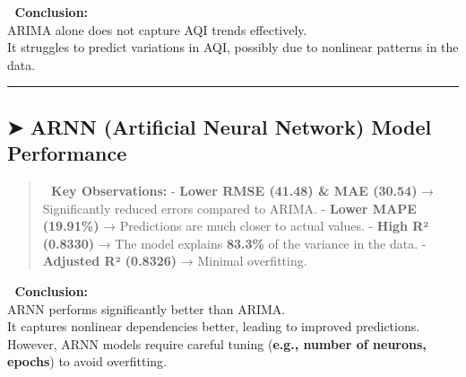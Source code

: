 \documentclass[11pt]{article}
\begin{document}
📌 \textbf{Conclusion:}\\
\hspace*{0.333em}\hspace*{0.333em}\hspace*{0.333em}\hspace*{0.333em}ARIMA
alone does not capture AQI trends effectively.\\
\hspace*{0.333em}\hspace*{0.333em}\hspace*{0.333em}\hspace*{0.333em}It
struggles to predict variations in AQI, possibly due to nonlinear
patterns in the data.

\begin{center}\rule{0.5\linewidth}{0.5pt}\end{center}

\hypertarget{arnn-artificial-neural-network-model-performance}{%
\subsection{\texorpdfstring{\textbf{➤ ARNN (Artificial Neural Network)
Model
Performance}}{➤ ARNN (Artificial Neural Network) Model Performance}}\label{arnn-artificial-neural-network-model-performance}}

\begin{quote}
\textbf{🔹 Key Observations:} - \textbf{Lower RMSE (41.48) \& MAE
(30.54)} → Significantly reduced errors compared to ARIMA. -
\textbf{Lower MAPE (19.91\%)} → Predictions are much closer to actual
values. - \textbf{High R² (0.8330)} → The model explains \textbf{83.3\%}
of the variance in the data. - \textbf{Adjusted R² (0.8326)} → Minimal
overfitting.
\end{quote}

📌 \textbf{Conclusion:}\\
\hspace*{0.333em}\hspace*{0.333em}\hspace*{0.333em}\hspace*{0.333em}ARNN
performs significantly better than ARIMA.\\
\hspace*{0.333em}\hspace*{0.333em}\hspace*{0.333em}\hspace*{0.333em}It
captures nonlinear dependencies better, leading to improved
predictions.\\
\hspace*{0.333em}\hspace*{0.333em}\hspace*{0.333em}\hspace*{0.333em}However,
ARNN models require careful tuning (\textbf{e.g., number of neurons,
epochs}) to avoid overfitting.
\end{document}
